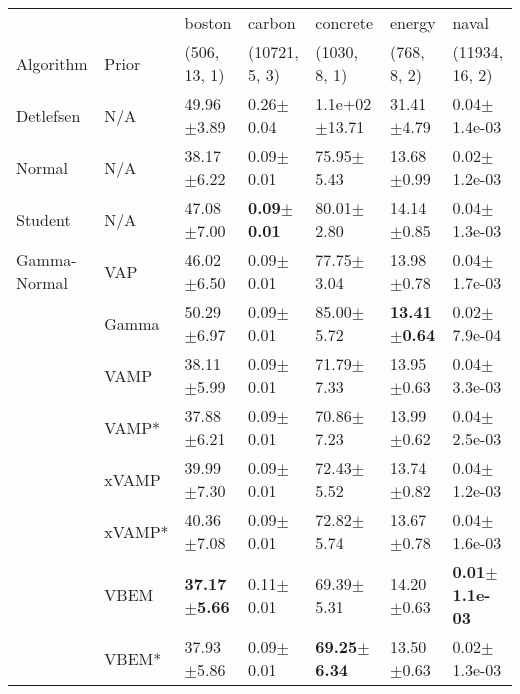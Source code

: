 \begin{tabular}{lllllll}
\toprule
             &       &                   boston &                  carbon &                 concrete &                   energy &                      naval \\
Algorithm & Prior& (506, 13, 1)& (10721, 5, 3)& (1030, 8, 1)& (768, 8, 2)& (11934, 16, 2)\\
\midrule
Detlefsen & N/A &           49.96$\pm$3.89 &           0.26$\pm$0.04 &        1.1e+02$\pm$13.71 &           31.41$\pm$4.79 &           0.04$\pm$1.4e-03 \\
Normal & N/A &           38.17$\pm$6.22 &           0.09$\pm$0.01 &           75.95$\pm$5.43 &           13.68$\pm$0.99 &           0.02$\pm$1.2e-03 \\
Student & N/A &           47.08$\pm$7.00 &  \textbf{0.09$\pm$0.01} &           80.01$\pm$2.80 &           14.14$\pm$0.85 &           0.04$\pm$1.3e-03 \\
Gamma-Normal & VAP &           46.02$\pm$6.50 &           0.09$\pm$0.01 &           77.75$\pm$3.04 &           13.98$\pm$0.78 &           0.04$\pm$1.7e-03 \\
             & Gamma &           50.29$\pm$6.97 &           0.09$\pm$0.01 &           85.00$\pm$5.72 &  \textbf{13.41$\pm$0.64} &           0.02$\pm$7.9e-04 \\
             & VAMP &           38.11$\pm$5.99 &           0.09$\pm$0.01 &           71.79$\pm$7.33 &           13.95$\pm$0.63 &           0.04$\pm$3.3e-03 \\
             & VAMP* &           37.88$\pm$6.21 &           0.09$\pm$0.01 &           70.86$\pm$7.23 &           13.99$\pm$0.62 &           0.04$\pm$2.5e-03 \\
             & xVAMP &           39.99$\pm$7.30 &           0.09$\pm$0.01 &           72.43$\pm$5.52 &           13.74$\pm$0.82 &           0.04$\pm$1.2e-03 \\
             & xVAMP* &           40.36$\pm$7.08 &           0.09$\pm$0.01 &           72.82$\pm$5.74 &           13.67$\pm$0.78 &           0.04$\pm$1.6e-03 \\
             & VBEM &  \textbf{37.17$\pm$5.66} &           0.11$\pm$0.01 &           69.39$\pm$5.31 &           14.20$\pm$0.63 &  \textbf{0.01$\pm$1.1e-03} \\
             & VBEM* &           37.93$\pm$5.86 &           0.09$\pm$0.01 &  \textbf{69.25$\pm$6.34} &           13.50$\pm$0.63 &           0.02$\pm$1.3e-03 \\
\midrule

\end{tabular}
